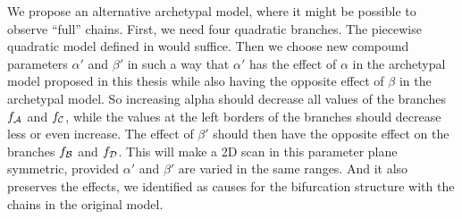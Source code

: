 We propose an alternative archetypal model, where it might be possible to observe ``full'' chains.
First, we need four quadratic branches.
The piecewise quadratic model defined in  would suffice.
Then we choose new compound parameters $\alpha'$ and $\beta'$ in such a way that $\alpha'$ has the effect of $\alpha$ in the archetypal model proposed in this thesis while also having the opposite effect of $\beta$ in the archetypal model.
So increasing alpha should decrease all values of the branches $f_{\mathcal{A}}$ and $f_{\mathcal{C}}$, while the values at the left borders of the branches should decrease less or even increase.
The effect of $\beta'$ should then have the opposite effect on the branches $f_{\mathcal{B}}$ and $f_{\mathcal{D}}$.
This will make a 2D scan in this parameter plane symmetric, provided $\alpha'$ and $\beta'$ are varied in the same ranges.
And it also preserves the effects, we identified as causes for the bifurcation structure with the chains in the original model.


